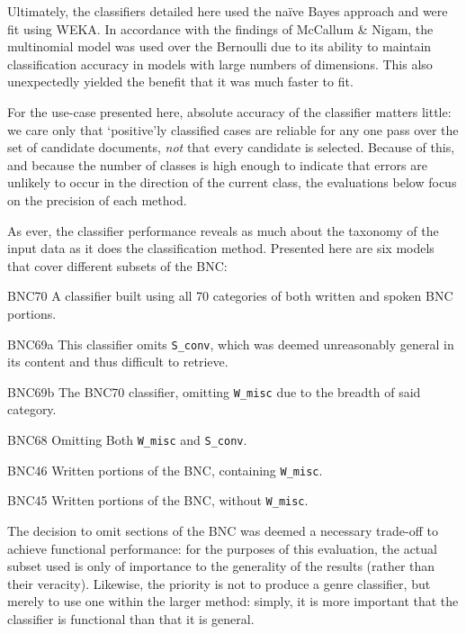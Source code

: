 Ultimately, the classifiers detailed here used the na\"ive Bayes approach and were fit using WEKA\cite{hall2009weka}.  In accordance with the findings of McCallum \& Nigam, the multinomial model was used over the Bernoulli due to its ability to maintain classification accuracy in models with large numbers of dimensions\cite{mccallum1998comparison}.  This also unexpectedly yielded the benefit that it was much faster to fit.

For the use-case presented here, absolute accuracy of the classifier matters little: we care only that `positive'ly classified cases are reliable for any one pass over the set of candidate documents, \textsl{not} that every candidate is selected.  Because of this, and because the number of classes is high enough to indicate that errors are unlikely to occur in the direction of the current class, the evaluations below focus on the precision of each method.

As ever, the classifier performance reveals as much about the taxonomy of the input data as it does the classification method.  Presented here are six models that cover different subsets of the BNC:

\begin{itemizeTitle}
    \item[BNC70] A classifier built using all 70 categories of both written and spoken BNC portions.
    \item[BNC69a] This classifier omits \texttt{S\_conv}, which was deemed unreasonably general in its content and thus difficult to retrieve.
    \item[BNC69b] The BNC70 classifier, omitting \texttt{W\_misc} due to the breadth of said category.
    \item[BNC68] Omitting Both \texttt{W\_misc} and \texttt{S\_conv}.
    \item[BNC46] Written portions of the BNC, containing \texttt{W\_misc}.
    \item[BNC45] Written portions of the BNC, without \texttt{W\_misc}.
\end{itemizeTitle}

The decision to omit sections of the BNC was deemed a necessary trade-off to achieve functional performance: for the purposes of this evaluation, the actual subset used is only of importance to the generality of the results (rather than their veracity).  Likewise, the priority is not to produce a genre classifier, but merely to use one within the larger method: simply, it is more important that the classifier is functional than that it is general.


